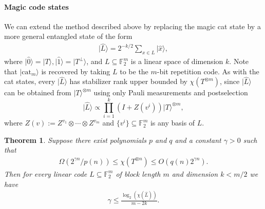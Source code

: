 \documentclass[a4paper,onecolumn,11pt,accepted=2021-11-11]{quantumarticle}
\newtheorem{theorem}{Theorem}
\newcommand{\hket}[1]{\ket{\hat{#1}}}
\newcommand{\cat}{\text{cat}}
\newcommand{\ket}[1]{\ensuremath{\lvert #1 \rangle}}
\begin{document}
\paragraph{Magic code states}
We can extend the method described above by replacing the magic cat state by a more general entangled state of the form
\begin{align}
\ket{\hat{L}} = 2^{-k/2}\sum_{x \in L} \hket{x},
\end{align}
where $\hket{0} = \ket{T}, \hket{1} = \ket{T^\perp}$, and $L \subseteq \mathbb{F}_2^m$ is a linear space of dimension $k$. Note that $\ket{\cat_m}$ is recovered by taking $L$ to be the $m$-bit repetition code. As with the cat states, every $\hket{L}$ has stabilizer rank upper bounded by $\chi(T^{\otimes m})$, since $\hket{L}$ can be obtained from $\ket{T}^{\otimes m}$ using only Pauli measurements and postselection
$$
\hket{L} \propto \prod_{i=1}^{k} (I + Z(v^i)) \ket{T}^{\otimes m},
$$
where $Z(v):= Z^{v_1} \otimes \cdots \otimes Z^{v_m}$ and $\{ v^i \} \subseteq \mathbb{F}_2^m$ is any basis of $L$.  
\begin{theorem}\label{code bound thm}
Suppose there exist polynomials $p$ and $q$ and a constant $\gamma > 0$ such that 
\begin{align}\label{eq: thm5}
\Omega(2^{\gamma n}/p(n)) \leq \chi(T^{\otimes n}) \leq O(q(n)2^{\gamma n}).    
\end{align}
Then for every linear code $L\subseteq \mathbb{F}_2^m$ of block length $m$ and dimension $k < m/2$ we have
\begin{align}\label{code bound}
\gamma \leq \frac{\log_2(\chi(\hat{L}))}{m - 2k}.
\end{align}
\end{theorem}
\end{document}
